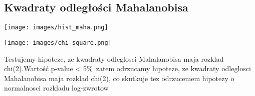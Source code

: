 \documentclass[a4paper,11pt]{article}
\begin{document}
\subsection{Kwadraty odległości Mahalanobisa}
\begin{center}
\texttt{[image: images/hist\_maha.png]}
\end{center}


\begin{center}
\texttt{[image: images/chi\_square.png]}
\end{center}
{Testujemy hipoteze, ze kwadraty odleglosci Mahalanobisa maja rozklad chi(2).Wartość  p-value < 5\%\, zatem odrzucamy hipoteze, ze kwadraty odleglosci Mahalanobisa maja rozklad chi(2),
co skutkuje tez odrzuceniem hipotezy o normalnosci rozkladu log-zwrotow}
\end{document}
